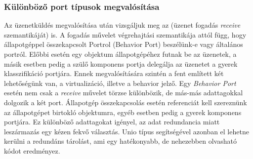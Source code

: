 \documentclass[a4paper,12pt]{report}
\begin{document}
\subsubsection{Különböző port típusok megvalósítása}
Az üzenetküldés megvalósítása után vizsgáljuk meg az (üzenet fogadás \textit{receive} szemantikáját) is. A fogadás művelet végrehajtási szemantikája attól függ, hogy állapotgéppel összekapcsolt Portrol (Behavior Port) beszélünk-e vagy általános portról. Előbbi esetén egy objektum állapotgépéhez futnak be az üzenetek, a másik esetben pedig a szülő komponens portja delegálja az üzenetet a gyerek klasszifikáció portjára. Ennek megvalósítására szintén a fent említett két lehetőségünk van, a virtualizáció, illetve a behavior jelző. Egy \textit{Behavior Port} esetén nem csak a \textit{receive} művelet törzse különbözik, de más-más adattagokkal dolgozik a két port. Állapotgép összekapcsolás esetén referenciát kell szereznünk az állapotgépet birtokló objektumra, egyéb esetben pedig a gyerek komponens portjára. Ez különböző adattagokat igényel, az adat redundancia miatt leszármazás egy kézen fekvő választás. Unio típus segítségével azonban el lehetne kerülni a redundáns tárolást, ami egy hatékonyabb, de nehezebben olvasható kódot eredményez.
\end{document}
